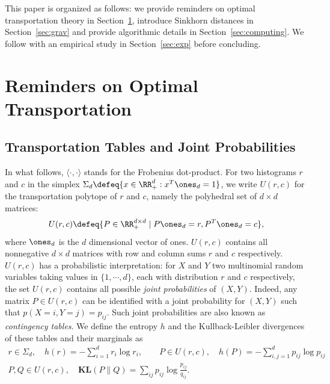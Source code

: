 \documentclass{amsart} %
\def\kl{\mathbf{KL}}
\begin{document}
This paper is organized as follows: we provide reminders on optimal transportation theory in Section~\ref{sec:rem}, introduce Sinkhorn distances in Section~\ref{sec:grav} and provide algorithmic details in Section~\ref{sec:computing}. We follow with an empirical study in Section~\ref{sec:exp} before concluding.

\section{Reminders on Optimal Transportation}\label{sec:rem}
\subsection{Transportation Tables and Joint Probabilities}  In what follows, $\langle \cdot,\cdot \rangle$ stands for the Frobenius dot-product. For two histograms $r$ and $c$ in the simplex $\Sigma_d\defeq \{x\in \RR^d_+: x^T\ones_d=1\}$,  we write $U(r,c)$ for the transportation polytope of $r$ and $c$, namely the polyhedral set of $d\times d$ matrices:
$$U(r,c)\defeq \{P\in\RR_+^{d\times d}\; |\; P\ones_d=r, P^T\ones_d=c\},$$
where $\ones_d$ is the $d$ dimensional vector of ones. $U(r,c)$ contains all nonnegative $d\times d$ matrices with row and column sums $r$ and $c$ respectively. $U(r,c)$ has a probabilistic interpretation: for $X$ and $Y$ two multinomial random variables taking values in $\{1,\cdots,d\}$, each with distribution $r$ and $c$ respectively, the set $U(r,c)$ contains all possible \emph{joint probabilities} of $(X,Y)$. Indeed, any matrix $P\in U(r,c)$ can be identified with a joint probability for $(X,Y)$ such that $p(X=i,Y=j)=p_{ij}$. Such joint probabilities are also known as \emph{contingency tables}. We define the entropy $h$ and the Kullback-Leibler divergences of these tables and their marginals as
\begin{gather*}
r\in\Sigma_d,\quad h(r)=-\sum_{i=1}^d r_i \log r_i,\quad \quad P\in U(r,c),\quad h(P)=-\sum_{i,j=1}^d p_{ij} \log p_{ij}\\ P,Q \in U(r,c),\quad \kl(P\|Q)=\sum_{ij}p_{ij}\log\frac{p_{ij}}{q_{ij}}.
\end{gather*}
\end{document}
